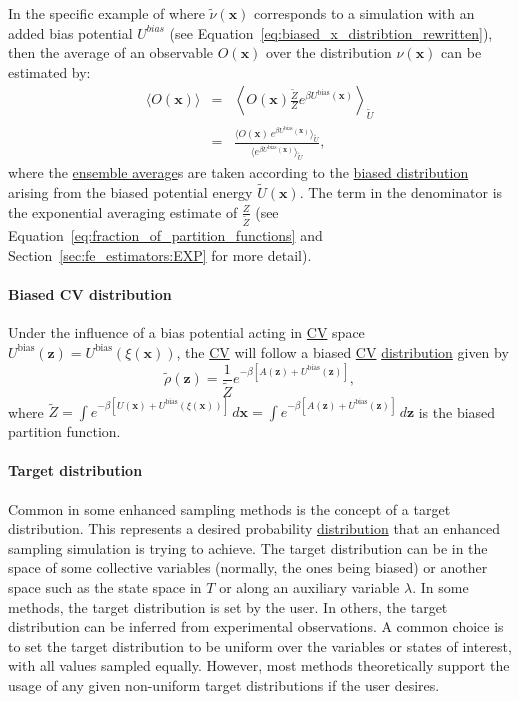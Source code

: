 \documentclass[9pt,review]{livecoms}
\newcommand{\vx}{\mathbf{x}}
\newcommand{\vz}{\mathbf{z}}
\begin{document}
In the specific example of where $\tilde \nu(\vx)$ corresponds to a simulation with an added bias potential $U^{bias}$ (see Equation~\ref{eq:biased_x_distribtion_rewritten}), then the average of an observable $O(\vx)$ over the distribution $\nu(\vx)$ can be estimated by:
\begin{eqnarray}
\label{eq:reweighting_bias_potential}
\langle O(\vx) \rangle &=& \left \langle O(\vx) \frac{\tilde{Z}}{Z}e^{\beta U^\mathrm{bias}(\vx)} \right \rangle_{\tilde U} \nonumber  \\
 &=& \frac{\langle O(\vx) \, e^{\beta U^\mathrm{bias}(\vx)} \rangle_{\tilde U}}
{\langle e^{\beta U^\mathrm{bias}(\vx)} \rangle_{\tilde U}},
\end{eqnarray}
where the \hyperlink{ref:ensemble_average} {ensemble average}s are taken according to the \hyperlink{ref:BiasedDist} {biased distribution} arising from the biased potential energy $\tilde U(\vx)$. The term in the denominator is the exponential averaging estimate of $\frac{Z}{\tilde Z}$ (see Equation~\ref{eq:fraction_of_partition_functions} and Section~\ref{sec:fe_estimators:EXP} for more detail).

\hypertarget{ref:BiasedCVDist} {\paragraph{Biased CV distribution}}
Under the influence of a bias potential acting in \hyperlink{ref:CV} {CV} space $U^\mathrm{bias}(\vz)=U^\mathrm{bias}(\xi(\vx))$, the \hyperlink{ref:CV} {CV} will follow a biased \hyperlink{ref:CV} {CV} \hyperlink{ref:Distribution} {distribution} given by
\begin{equation}
\label{eq:BiasedCVDistrib}
\tilde \rho(\vz) = \frac{1}{\tilde{Z}} 
e^{-\beta \left[
A(\vz) + U^\mathrm{bias}(\vz)
\right]},
\end{equation}
where $\tilde{Z} = \int e^{-\beta\left [ U(\vx) + U^\mathrm{bias}(\xi(\vx)) \right]} \, d\vx = \int e^{-\beta\left [ A(\vz) + U^\mathrm{bias}(\vz) \right]} \, d\vz$ is the biased partition function.

\hypertarget{ref:targetdist}{\paragraph{Target distribution}}
Common in some enhanced sampling methods is the concept of a target distribution. This represents a desired probability \hyperlink{ref:Distribution} {distribution} that an enhanced sampling simulation is trying to achieve. The target distribution can be in the space of some collective variables (normally, the ones being biased) or another space such as the state space in $T$ or along an auxiliary variable $\lambda$. In some methods, the target distribution is set by the user. In others, the target distribution can be inferred from experimental observations. A common choice is to set the target distribution to be uniform over the variables or states of interest, with all values sampled equally. However, most methods theoretically support the usage of any given non-uniform target distributions if the user desires.
\end{document}
